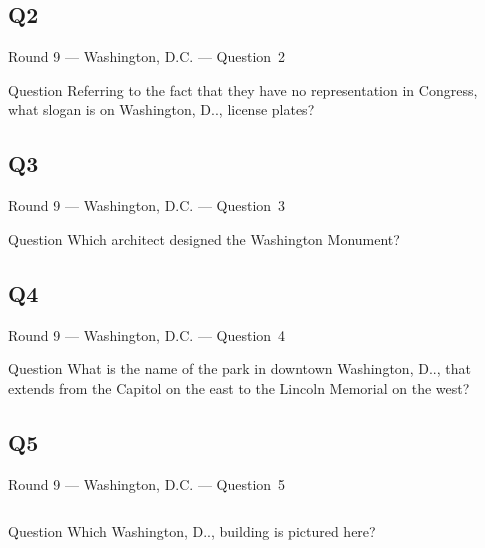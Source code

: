 \documentclass[11pt]{beamer}
\begin{document}
\subsection*{Q2}
\begin{frame}[t]{Round 9 --- Washington, D.C. --- \mbox{Question 2}}
\vspace{-0.5em}
\begin{block}{Question}
Referring to the fact that they have no representation in Congress, what slogan is on Washington, D.\@C.\@, license plates?
\end{block}
\end{frame}
\subsection*{Q3}
\begin{frame}[t]{Round 9 --- Washington, D.C. --- \mbox{Question 3}}
\vspace{-0.5em}
\begin{block}{Question}
Which architect designed the Washington Monument?
\end{block}
\end{frame}
\subsection*{Q4}
\begin{frame}[t]{Round 9 --- Washington, D.C. --- \mbox{Question 4}}
\vspace{-0.5em}
\begin{block}{Question}
What is the name of the park in downtown Washington, D.\@C.\@, that extends from the Capitol on the east to the Lincoln Memorial on the west?
\end{block}
\end{frame}
\subsection*{Q5}
\begin{frame}[t]{Round 9 --- Washington, D.C. --- \mbox{Question 5}}
\vspace{-0.5em}
\begin{columns}[T,totalwidth=\linewidth]
\begin{column}{0.32\linewidth}
\begin{block}{Question}
Which Washington, D.\@C.\@, building is pictured here?
\end{block}
\end{column}
\begin{column}{0.65\linewidth}
\begin{center}
\texttt{[image: \{Images/libraryofcongress]}.jpg}
\end{center}
\end{column}
\end{columns}
\end{frame}
\end{document}
